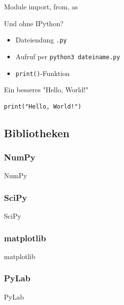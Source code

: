 \begin{frame}{Module}
  import, from, as
\end{frame}

\begin{frame}[fragile]{Und ohne IPython?}
  \begin{itemize}
    \item Dateiendung \texttt{.py}
    \item Aufruf per \texttt{python3 dateiname.py}
    \item \texttt{print()}-Funktion 
  \end{itemize}
  \begin{spacing}{1.0}
    \begin{exampleblock}{Ein besseres "Hello, World!"}
      \begin{verbatim}
print("Hello, World!")
      \end{verbatim}
    \end{exampleblock}
  \end{spacing}
\end{frame}

\subsection{Bibliotheken}
\subsubsection{NumPy}
\begin{frame}{NumPy}
\end{frame}

\subsubsection{SciPy}
\begin{frame}{SciPy}
\end{frame}

\subsubsection{matplotlib}
\begin{frame}{matplotlib}
\end{frame}

\subsubsection{PyLab}
\begin{frame}{PyLab}
\end{frame}
